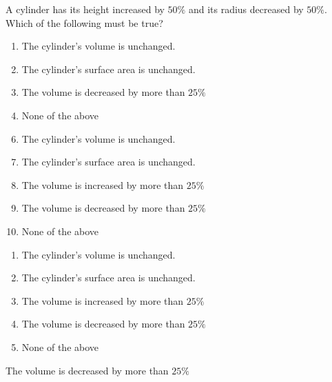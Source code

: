 

 A cylinder has its height increased by $50\%$ and its radius decreased by $50\%$.  Which of the following must be true?



\ifsat
	\begin{enumerate}[label=\Alph*)]
		\item    The cylinder's volume is unchanged.
		\item    The cylinder's surface area is unchanged.
		\item  The volume is decreased by more than $25\%$ %
		\item  None of the above
	\end{enumerate}
\else
\fi

\ifacteven
	\begin{enumerate}[label=\textbf{\Alph*.},itemsep=\fill,align=left]
		\setcounter{enumii}{5}
		\item    The cylinder's volume is unchanged.
		\item    The cylinder's surface area is unchanged.
		\item  The volume is increased by more than $25\%$
		\addtocounter{enumii}{1}
		\item  The volume is decreased by more than $25\%$ %
		\item  None of the above
	\end{enumerate}
\else
\fi

\ifactodd
	\begin{enumerate}[label=\textbf{\Alph*.},itemsep=\fill,align=left]
		\item    The cylinder's volume is unchanged.
		\item    The cylinder's surface area is unchanged.
		\item  The volume is increased by more than $25\%$
		\item  The volume is decreased by more than $25\%$ %
		\item  None of the above
	\end{enumerate}
\else
\fi

\ifgridin
  The volume is decreased by more than $25\%$ %
		
\else
\fi

